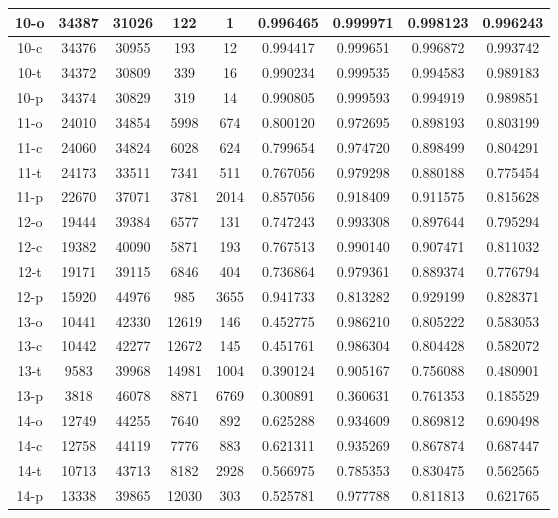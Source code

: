 \begin{longtable}[!h]{|c|c|c|c|c|c|c|c|c|}
	\hline	\rowcolor{closest} 10-o	&	34387	&	31026	&	122	&	1	&	0.996465	&	0.999971	&	0.998123	&	0.996243	\\
	\hline	10-c	&	34376	&	30955	&	193	&	12	&	0.994417	&	0.999651	&	0.996872	&	0.993742	\\
	\hline	\rowcolor{bad} 10-t	&	34372	&	30809	&	339	&	16	&	0.990234	&	0.999535	&	0.994583	&	0.989183	\\
	\hline	10-p	&	34374	&	30829	&	319	&	14	&	0.990805	&	0.999593	&	0.994919	&	0.989851	\\
	
	\hline	11-o	&	24010	&	34854	&	5998	&	674	&	0.800120	&	0.972695	&	0.898193	&	0.803199	\\
	\hline	11-c	&	24060	&	34824	&	6028	&	624	&	0.799654	&	0.974720	&	0.898499	&	0.804291	\\
	\hline	\rowcolor{bad} 11-t	&	24173	&	33511	&	7341	&	511	&	0.767056	&	0.979298	&	0.880188	&	0.775454	\\
	\hline	\rowcolor{closest} 11-p	&	22670	&	37071	&	3781	&	2014	&	0.857056	&	0.918409	&	0.911575	&	0.815628	\\

	\hline	12-o	&	19444	&	39384	&	6577	&	131	&	0.747243	&	0.993308	&	0.897644	&	0.795294	\\
	\hline	12-c	&	19382	&	40090	&	5871	&	193	&	0.767513	&	0.990140	&	0.907471	&	0.811032	\\
	\hline	\rowcolor{bad} 12-t	&	19171	&	39115	&	6846	&	404	&	0.736864	&	0.979361	&	0.889374	&	0.776794	\\
	\hline	\rowcolor{closest} 12-p	&	15920	&	44976	&	985	&	3655	&	0.941733	&	0.813282	&	0.929199	&	0.828371	\\

	\hline	\rowcolor{closest} 13-o	&	10441	&	42330	&	12619	&	146	&	0.452775	&	0.986210	&	0.805222	&	0.583053	\\
	\hline	13-c	&	10442	&	42277	&	12672	&	145	&	0.451761	&	0.986304	&	0.804428	&	0.582072	\\
	\hline	\rowcolor{bad} 13-t	&	9583	&	39968	&	14981	&	1004	&	0.390124	&	0.905167	&	0.756088	&	0.480901	\\
	\hline	13-p	&	3818	&	46078	&	8871	&	6769	&	0.300891	&	0.360631	&	0.761353	&	0.185529	\\

	\hline	\rowcolor{closest} 14-o	&	12749	&	44255	&	7640	&	892	&	0.625288	&	0.934609	&	0.869812	&	0.690498	\\
	\hline	14-c	&	12758	&	44119	&	7776	&	883	&	0.621311	&	0.935269	&	0.867874	&	0.687447	\\
	\hline	14-t	&	10713	&	43713	&	8182	&	2928	&	0.566975	&	0.785353	&	0.830475	&	0.562565	\\
	\hline	\rowcolor{bad} 14-p	&	13338	&	39865	&	12030	&	303	&	0.525781	&	0.977788	&	0.811813	&	0.621765	\\
	

\end{longtable}
